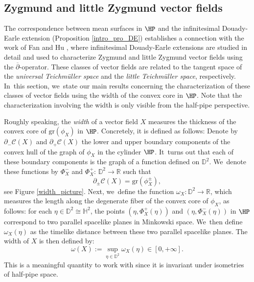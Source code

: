 \subsection{Zygmund and little Zygmund vector fields}

The correspondence between mean surfaces in \(\HP \) and the infinitesimal Douady-Earle extension (Proposition \ref{intro_pro_DE}) establishes a connection with the work of Fan and Hu \cite{Fan_Hu_Little}, where infinitesimal Douady-Earle extensions are studied in detail and used to characterize Zygmund and little Zygmund vector fields using the \(\overline{\partial}\)-operator. These classes of vector fields are related to the tangent space of the \emph{universal Teichmüller space} and the \emph{little Teichmüller space}, respectively. In~this section, we~state our main results concerning the characterization of these classes of vector fields using the width of the convex core in \(\HP \). Note that the characterization involving the width is only visible from the half-pipe perspective.

Roughly speaking, the \emph{width} of a vector field \(X \) measures the thickness of the convex core of \(\mathrm{gr}(\phi_X) \) in \(\HP \). Concretely, it is defined as follows: Denote by \(\partial_{-}\mathcal{C}(X) \) and \(\partial_+\mathcal{C}(X) \) the lower and upper boundary components of the convex hull of the graph of \(\phi_X \) in the cylinder \(\HP \). It~turns out that each of these boundary components is the graph of a function defined on \(\mathbb{D}^2 \). We~denote these functions by \(\Phi_X^- \) and \(\Phi_X^+ \): \(\mathbb{D}^2 \to \mathbb{R} \) such that
\[
\partial_{\pm}\mathcal{C}(X) = \mathrm{gr}(\phi_X^{\pm}),
\]
see Figure \ref{width_picture}. Next, we~define the function \(\omega_X:\mathbb{D}^2\to\mathbb{R} \), which measures the length along the degenerate fiber of the convex core of \(\phi_X \), as follows: for each \(\eta \in \mathbb{D}^2 \cong \mathbb{H}^2 \), the points \((\eta,\Phi_X^+(\eta)) \) and \((\eta,\Phi_X^-(\eta)) \) in \(\HP \) correspond to two parallel spacelike planes in Minkowski space. We~then define \(\omega_X(\eta) \) as the timelike distance between these two parallel spacelike planes. The width of \(X \) is then defined by:
\[
\omega(X) := \sup_{\eta\in\mathbb{D}^2} \omega_X(\eta)\in[0,+\infty].
\]
This is a meaningful quantity to work with since it is invariant under isometries of half-pipe space.

